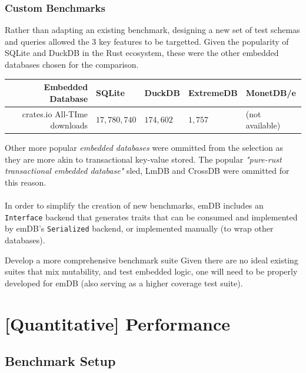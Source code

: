 \subsubsection{Custom Benchmarks}
Rather than adapting an existing benchmark, designing a new set of test schemas and queries allowed the 3 key features to be targetted.
Given the popularity of SQLite and DuckDB in the Rust ecosystem, these were the other embedded databases chosen for the comparison.
\begin{center}
    \begin{tabular}{r | l | l | l | l |}
        Embedded Database            & SQLite       & DuckDB    & ExtremeDB & MonetDB/e       \\
        \hline
        crates.io All-TIme downloads & $17,780,740$ & $174,602$ & $1,757$   & (not available) \\
    \end{tabular}
\end{center}
Other more popular \textit{embedded databases} were ommitted from the selection as they are more akin
to transactional key-value stored. The popular \textit{"pure-rust transactional embedded database"} sled\cite{SledRepo}, LmDB\cite{LMDBWebsite} and CrossDB\cite{CrossDBWebsite} were ommitted for this reason.
\\
\\ In order to simplify the creation of new benchmarks, emDB includes an \texttt{Interface} backend that generates traits that can be consumed and implemented by emDB's \texttt{Serialized} backend, or implemented manually (to wrap other databases).
\begin{futurebox}{Develop a more comprehensive benchmark suite}
    Given there are no ideal existing suites that mix mutability, and test embedded logic, one will need to be properly developed for emDB (also serving as a higher coverage test suite).
\end{futurebox}

\section{[Quantitative] Performance}
\subsection{Benchmark Setup}
